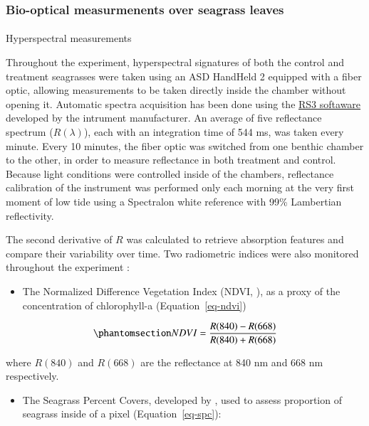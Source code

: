 \documentclass[
  number]{elsarticle}
\makeatletter
\let\oldparagraph\paragraph
\renewcommand{\paragraph}{
    \@ifstar
      \xxxParagraphStar
      \xxxParagraphNoStar
  }
\newcommand{\xxxParagraphStar}[1]{\oldparagraph*{#1}\mbox{}}
\newcommand{\xxxParagraphNoStar}[1]{\oldparagraph{#1}\mbox{}}
\providecommand{\tightlist}{%
  \setlength{\itemsep}{0pt}\setlength{\parskip}{0pt}}\usepackage{longtable,booktabs,array}
\makeatother
\begin{document}
\subsubsection{Bio-optical measurmenents over seagrass
leaves}\label{bio-optical-measurmenents-over-seagrass-leaves}

\paragraph{Hyperspectral measurements}\label{hyperspectral-measurements}

Throughout the experiment, hyperspectral signatures of both the control
and treatment seagrasses were taken using an ASD HandHeld 2 equipped
with a fiber optic, allowing measurements to be taken directly inside
the chamber without opening it. Automatic spectra acquisition has been
done using the
\href{https://www.malvernpanalytical.com/en/learn/knowledge-center/user-manuals/rs3-software-user-manual}{RS3
softaware} developed by the intrument manufacturer. An average of five
reflectance spectrum (\(R(\lambda)\)), each with an integration time of
544 ms, was taken every minute. Every 10 minutes, the fiber optic was
switched from one benthic chamber to the other, in order to measure
reflectance in both treatment and control. Because light conditions were
controlled inside of the chambers, reflectance calibration of the
instrument was performed only each morning at the very first moment of
low tide using a Spectralon white reference with 99\% Lambertian
reflectivity.

The second derivative of \(R\) was calculated to retrieve absorption
features and compare their variability over time. Two radiometric
indices were also monitored throughout the experiment :

\begin{itemize}
\tightlist
\item
  The Normalized Difference Vegetation Index (NDVI,
  \citep{rouse1974monitoring}), as a proxy of the concentration of
  chlorophyll-a (Equation~\ref{eq-ndvi})
\end{itemize}

\begin{equation}\phantomsection\label{eq-ndvi}{
NDVI = \frac{R(840)-R(668)}{R(840)+R(668)}
}\end{equation}

where \(R(840)\) and \(R(668)\) are the reflectance at 840 nm and 668 nm
respectively.

\begin{itemize}
\tightlist
\item
  The Seagrass Percent Covers, developed by \citep{zoffoli2020sentinel},
  used to assess proportion of seagrass inside of a pixel
  (Equation~\ref{eq-spc}):
\end{itemize}
\end{document}
